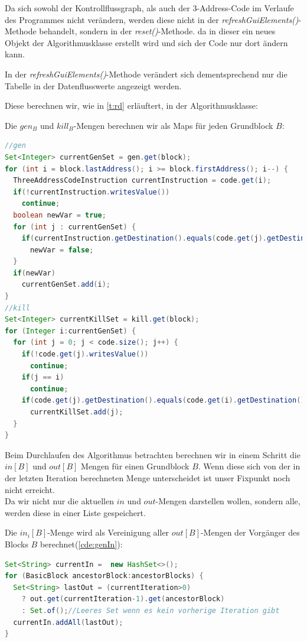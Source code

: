 Da sich sowohl der Kontrollflussgraph, als auch der 3-Address-Code im
Verlaufe des Programmes nicht verändern, werden diese nicht in der
\textit{refreshGuiElements()}-Methode behandelt, sondern in der \textit{reset()}-Methode.
da in dieser ein neues Objekt der Algorithmusklasse erstellt wird und
sich der Code nur dort ändern kann.

In der \textit{refreshGuiElements()}-Methode verändert sich dementsprechend
nur die Tabelle in der Datenflusswerte angezeigt werden.

Diese berechnen wir, wie in \cref{t:rd} erläuftert, in der Algorithmusklasse:

Die $gen_B$ und $kill_B$-Mengen berechnen wir als Maps für jeden Grundblock $B$: 
\begin{lstlisting}[language=Java, caption={Berechnung einer $gen$ und $kill$-Menge}, label={cde:gen}]
//gen
Set<Integer> currentGenSet = gen.get(block);
for (int i = block.lastAddress(); i >= block.firstAddress(); i--) {
  ThreeAddressCodeInstruction currentInstruction = code.get(i);
  if(!currentInstruction.writesValue())
    continue;
  boolean newVar = true;
  for (int j : currentGenSet) {
    if(currentInstruction.getDestination().equals(code.get(j).getDestination()))
      newVar = false;
  }
  if(newVar)
    currentGenSet.add(i);
}
//kill
Set<Integer> currentKillSet = kill.get(block);
for (Integer i:currentGenSet) {
  for (int j = 0; j < code.size(); j++) {
    if(!code.get(j).writesValue())
      continue;
    if(j == i)
      continue;
    if(code.get(j).getDestination().equals(code.get(i).getDestination()))
      currentKillSet.add(j);
  }
}
\end{lstlisting}

Beim Durchlaufen des Algorithmus betrachten berechnen wir
in einem Schritt die $in[B]$ und $out[B]$ Mengen für einen Grundblock $B$.
Wenn diese sich von der in der letzten Iteration berechneten Menge
unterscheidet ist unser Fixpunkt noch nicht erreicht.\\

Da wir nicht nur die aktuellen $in$ und $out$-Mengen darstellen wollen,
sondern alle, werden diese in einer Liste gespeichert.

Die $in_i[B]$-Menge wird als Vereinigung aller $out[B]$-Mengen der Vorgänger
des Blocks $B$ berechnet(\cref{cde:genIn}):
\begin{lstlisting}[language=Java, caption={Berechnen der $in$-Menge}, label={cde:rdIn}]
Set<String> currentIn =  new HashSet<>();
for (BasicBlock ancestorBlock:ancestorBlocks) {
  Set<String> lastOut = (currentIteration>0) 
    ? out.get(currentIteration-1).get(ancestorBlock)
    : Set.of();//Leeres Set wenn es kein vorherige Iteration gibt
  currentIn.addAll(lastOut);
}
\end{lstlisting}

